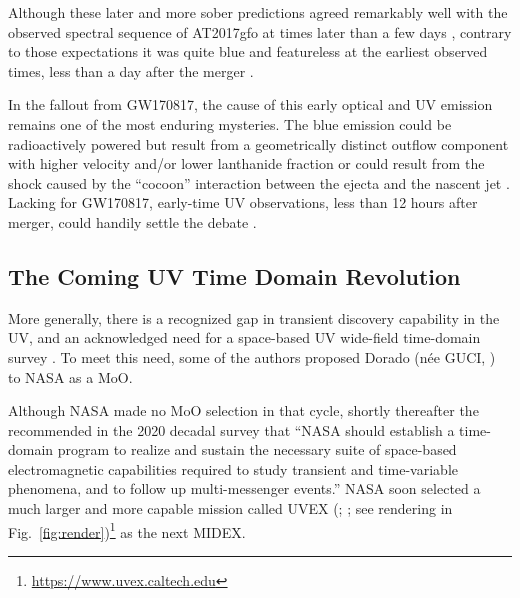 \documentclass[twocolumn,times]{aastex631}
\begin{document}
Although these later and more sober predictions agreed remarkably well with the observed spectral sequence of AT2017gfo at times later than a few days \citep{2017Natur.551...67P,2017Natur.551...80K,2017ApJ...851L..21V,2017Sci...358.1583K,2017Sci...358.1570D}, contrary to those expectations it was quite blue and featureless at the earliest observed times, less than a day after the merger \citep{2017Sci...358.1574S}.

In the fallout from GW170817, the cause of this early optical and \ac{UV} emission remains one of the most enduring mysteries. The blue emission could be radioactively powered but result from a geometrically distinct outflow component with higher velocity and/or lower lanthanide fraction \citep{2017ApJ...848L..18N} or could result from the shock caused by the ``cocoon'' interaction between the ejecta and the nascent jet \citep{2017Sci...358.1559K,2018MNRAS.479..588G}. Lacking for GW170817, early-time \ac{UV} observations, less than 12 hours after merger, could handily settle the debate \citep{2018ApJ...855L..23A}.

\subsection{The Coming UV Time Domain Revolution}

More generally, there is a recognized gap in transient discovery capability in the \ac{UV}, and an acknowledged need for a space-based \ac{UV} wide-field time-domain survey \citep{2014AJ....147...79S}. To meet this need, some of the authors proposed Dorado (n\'{e}e GUCI, \citealt{2019AAS...23421203C,2023ApJ...944..126D}) to NASA as a \ac{MoO}.

Although NASA made no \ac{MoO} selection in that cycle, shortly thereafter the \citet{2021pdaa.book.....N} recommended in the 2020 decadal survey that ``NASA should establish a time-domain program to realize and sustain the necessary suite of space-based electromagnetic capabilities required to study transient and time-variable phenomena, and to follow up multi-messenger events.'' NASA soon selected a much larger and more capable mission called \acl{UVEX} (; \citealt{2021arXiv211115608K}; see rendering in Fig.~\ref{fig:render})\footnote{\url{https://www.uvex.caltech.edu}} as the next \ac{MIDEX}.
\end{document}
